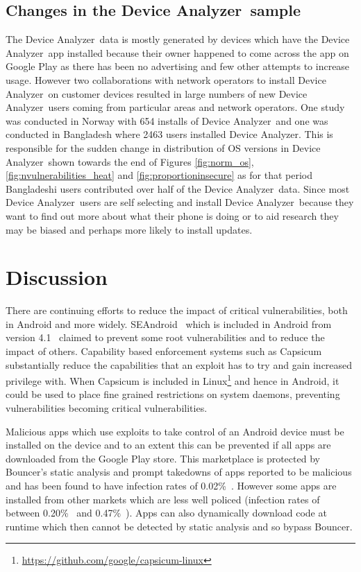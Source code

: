 \documentclass[conference,a4paper,twoside]{IEEEtran}
\newcommand{\da}{Device Analyzer}
\begin{document}
\subsection{Changes in the \da\ sample}
The \da\ data is mostly generated by devices which have the \da\ app installed because their owner happened to come across the app on Google Play as there has been no advertising and few other attempts to increase usage.
However two collaborations with network operators to install \da\ on customer devices resulted in large numbers of new \da\ users coming from particular areas and network operators.
One study was conducted in Norway with 654 installs of \da\ and one was conducted in Bangladesh where 2463 users installed \da.
This is responsible for the sudden change in distribution of OS versions in \da\ shown towards the end of Figures \ref{fig:norm_os}, \ref{fig:nvulnerabilities_heat} and \ref{fig:proportioninsecure} as for that period Bangladeshi users contributed over half of the \da\ data.
Since most \da\ users are self selecting and install \da\ because they want to find out more about what their phone is doing or to aid research they may be biased and perhaps more likely to install updates.


\section{Discussion}
There are continuing efforts to reduce the impact of critical vulnerabilities, both in Android and more widely.
SEAndroid~\cite{Smalley2013} which is included in Android from version 4.1~\cite{jelly-bean-release} claimed to prevent some root vulnerabilities and to reduce the impact of others.
Capability based enforcement systems such as Capsicum~\cite{Watson2010} substantially reduce the capabilities that an exploit has to try and gain increased privilege with.
When Capsicum is included in Linux\footnote{\url{https://github.com/google/capsicum-linux}} and hence in Android, it could be used to place fine grained restrictions on system daemons, preventing vulnerabilities becoming critical vulnerabilities.

Malicious apps which use exploits to take control of an Android device must be installed on the device and to an extent this can be prevented if all apps are downloaded from the Google Play store.
This marketplace is protected by Bouncer's static analysis and prompt takedowns of apps reported to be malicious and has been found to have infection rates of 0.02\%~\cite{Zhou2012a}.
However some apps are installed from other markets which are less well policed (infection rates of between 0.20\%~ and 0.47\%~\cite{Zhou2012a}).
Apps can also dynamically download code at runtime which then cannot be detected by static analysis and so bypass Bouncer.
\end{document}
